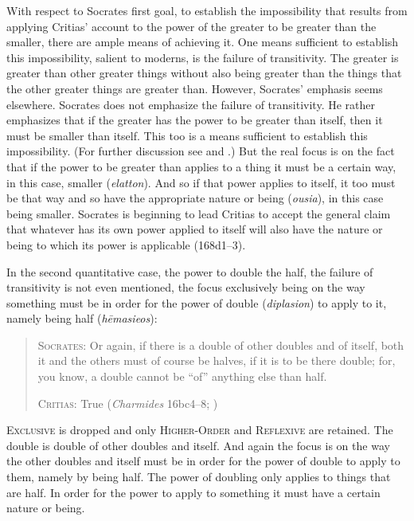 With respect to Socrates first goal, to establish the impossibility that results from applying Critias' account to the power of the greater to be greater than the smaller, there are ample means of achieving it. One means sufficient to establish this impossibility, salient to moderns, is the failure of transitivity. The greater is greater than other greater things without also being greater than the things that the other greater things are greater than. However, Socrates' emphasis seems elsewhere. Socrates does not emphasize the failure of transitivity. He rather emphasizes that if the greater has the power to be greater than itself, then it must be smaller than itself. This too is a means sufficient to establish this impossibility. (For further discussion see \citealt[4 n9]{McCabe:2007ss} and \citealt[44–7]{Duncombe:2020gi}.) But the real focus is on the fact that if the power to be greater than applies to a thing it must be a certain way, in this case, smaller (\emph{elatton}). And so if that power applies to itself, it too must be that way and so have the appropriate nature or being (\emph{ousia}), in this case being smaller. Socrates is beginning to lead Critias to accept the general claim that whatever has its own power applied to itself will also have the nature or being to which its power is applicable (168d1–3). 

In the second quantitative case, the power to double the half, the failure of transitivity is not even mentioned, the focus exclusively being on the way something must be in order for the power of double (\emph{diplasion}) to apply to it, namely being half (\emph{hēmasieos}):
\begin{quotation}
	\textsc{Socrates}: Or again, if there is a double of other doubles and of itself, both it and the others must of course be halves, if it is to be there double; for, you know, a double cannot be ``of'' anything else than half.
	
	\textsc{Critias}: True (\emph{Charmides} 16bc4–8; \citealt[61–3]{Lamb:1927qw})
\end{quotation}
\textsc{Exclusive} is dropped and only \textsc{Higher-Order} and \textsc{Reflexive} are retained. The double is double of other doubles and itself. And again the focus is on the way the other doubles and itself must be in order for the power of double to apply to them, namely by being half. The power of doubling only applies to things that are half. In order for the power to apply to something it must have a certain nature or being.

